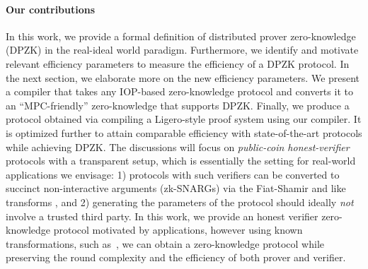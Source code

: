 \paragraph*{Our contributions}
In this work, we provide a formal definition of distributed prover zero-knowledge (DPZK) in the real-ideal world paradigm. Furthermore, we identify and motivate relevant efficiency parameters to measure the efficiency of a DPZK protocol. In the next section, we elaborate more on the new efficiency parameters.
We present a compiler that takes any IOP-based zero-knowledge protocol and converts it to an ``MPC-friendly'' zero-knowledge that supports DPZK.
Finally, we produce a protocol obtained via compiling a Ligero-style proof system using our compiler. It is optimized further to attain comparable efficiency with state-of-the-art protocols while achieving DPZK.
The discussions will focus on {\em public-coin honest-verifier} protocols with a transparent setup, which is essentially the setting for real-world applications we envisage: 1) protocols with such verifiers can be converted to succinct non-interactive arguments (zk-SNARGs) via the Fiat-Shamir and like transforms \cite{FS86, BCS16}, and 2) generating the parameters of the protocol should ideally {\em not} involve a trusted third party. In this work, we provide an honest verifier zero-knowledge protocol motivated by applications, however using known transformations, such as~\cite{hubavcek2018efficiency}, we can obtain a zero-knowledge protocol while preserving the round complexity and the efficiency of both prover and verifier.


